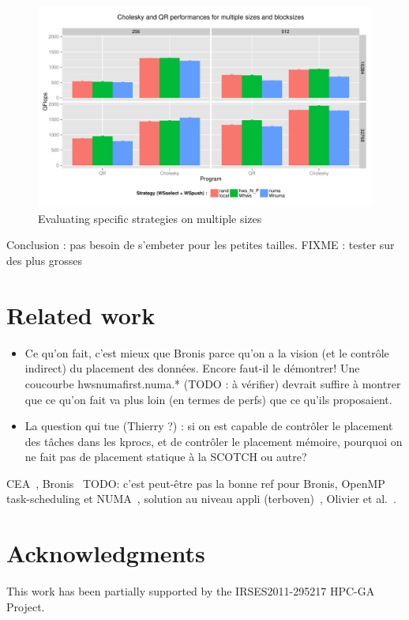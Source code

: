 \documentclass{Styles/llncs}
\begin{document}
\begin{figure}[t]
  \centering
  \includegraphics[scale=0.6]{figures/graph_details_strat.pdf}
\caption{Evaluating specific strategies on multiple sizes}
\label{fig:eval-strat-sizes}
\end{figure}

Conclusion : pas besoin de s'embeter pour les petites tailles.
FIXME : tester sur des plus grosses

\section{Related work}
\begin{itemize}
\item Ce qu'on fait, c'est mieux que Bronis parce qu'on a la vision
  (et le contrôle indirect) du placement des données. Encore faut-il
  le démontrer! Une coucourbe hwsnumafirst.numa.* (TODO : à vérifier)
  devrait suffire à montrer que ce qu'on fait va plus loin (en termes
  de perfs) que ce qu'ils proposaient.
\item La question qui tue (Thierry ?) : si on est capable de contrôler le
  placement des tâches dans les kprocs, et de contrôler le placement
  mémoire, pourquoi on ne fait pas de placement statique à la SCOTCH
  ou autre?
\end{itemize}

CEA~\cite{DBLP:conf/europar/Clet-OrtegaCP14},
Bronis~\cite{DBLP:journals/sp/OlivierSSP13} TODO: c'est peut-être pas
la bonne ref pour Bronis, OpenMP task-scheduling et
NUMA~\cite{DBLP:journals/corr/Tahan14}, solution au niveau appli
(terboven)~\cite{DBLP:conf/europar/TerbovenSCM12}, Olivier et al.~\cite{DBLP:journals/ijhpca/OlivierPWSP12}.


\section*{Acknowledgments}

This work has been partially supported by the IRSES2011-295217
HPC-GA Project.

  \small 
  
\end{document}
